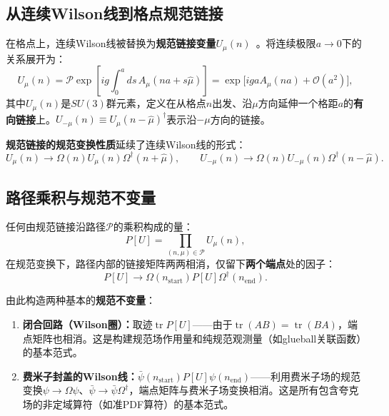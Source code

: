 \documentclass[12pt,a4paper]{ctexart}
\theoremstyle{definition}
\begin{document}
\subsection{从连续Wilson线到格点规范链接}

在格点上，连续Wilson线被替换为\textbf{规范链接变量}$U_\mu(n)$~\cite{GattringerLang2010}。将连续极限$a\to 0$下的关系展开为：
\begin{equation}
U_\mu(n) = \mathcal{P}\exp\!\left[ig\int_0^a ds\, A_\mu(n a + s\hat\mu)\right] = \exp\!\big[ig a A_\mu(n a) + \mathcal{O}(a^2)\big],
\label{eq:link_variable_def}
\end{equation}
其中$U_\mu(n)$是$SU(3)$群元素，定义在从格点$n$出发、沿$\mu$方向延伸一个格距$a$的\textbf{有向链接}上。$U_{-\mu}(n) \equiv U_\mu(n-\hat\mu)^\dagger$表示沿$-\mu$方向的链接。

\textbf{规范链接的规范变换性质}延续了连续Wilson线的形式：
\begin{equation}
U_\mu(n) \to \Omega(n) U_\mu(n) \Omega^\dagger(n+\hat\mu), \qquad U_{-\mu}(n) \to \Omega(n) U_{-\mu}(n) \Omega^\dagger(n-\hat\mu).
\label{eq:link_gauge_trans}
\end{equation}

\subsection{路径乘积与规范不变量}

任何由规范链接沿路径$\mathcal{P}$的乘积构成的量：
\begin{equation}
P[U] = \prod_{(n,\mu)\in\mathcal{P}} U_\mu(n),
\label{eq:path_product}
\end{equation}
在规范变换下，路径内部的链接矩阵两两相消，仅留下\textbf{两个端点}处的因子：
\begin{equation}
P[U] \to \Omega(n_{\text{start}}) P[U] \Omega^\dagger(n_{\text{end}}).
\label{eq:path_product_gauge}
\end{equation}

由此构造两种基本的\textbf{规范不变量}：

\begin{enumerate}[leftmargin=*]
    \item \textbf{闭合回路（Wilson圈）：}取迹$\operatorname{tr} P[U]$——由于$\operatorname{tr}(AB)=\operatorname{tr}(BA)$，端点矩阵也相消。这是构建规范场作用量和纯规范观测量（如glueball关联函数）的基本范式。
    \item \textbf{费米子封盖的Wilson线：}$\bar\psi(n_{\text{start}})P[U]\psi(n_{\text{end}})$——利用费米子场的规范变换$\psi\to\Omega\psi$、$\bar\psi\to\bar\psi\Omega^\dagger$，端点矩阵与费米子场变换相消。这是所有包含夸克场的非定域算符（如准PDF算符）的基本范式。
\end{enumerate}
\end{document}
